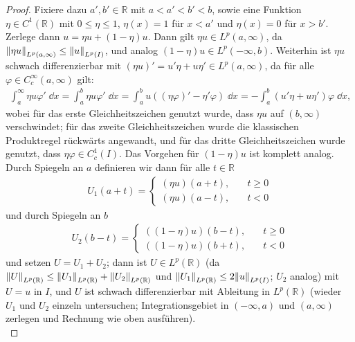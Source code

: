 \documentclass[twoside]{article}
\theoremstyle{definition}
\newcommand{\R}{\mathbb{R}}
\newcommand{\lk}{\left(}
\newcommand{\rk}{\right)}
\begin{document}
\begin{proof}
Fixiere dazu $a',b' \in \R$ mit $a < a' < b' < b$, sowie eine Funktion $\eta \in C^1(\R)$ mit $0 \leq \eta \leq 1$, $\eta(x) = 1$ für $x < a'$ und $\eta(x) = 0$ für $x > b'$. Zerlege dann $u = \eta u + (1-\eta)u$. Dann gilt $\eta u \in L^p(a, \infty)$, da $\norm{\eta u}_{L^p(a,\infty)} \leq \norm{u}_{L^p(I)}$, und analog $(1 - \eta) u \in L^p(-\infty,b)$. Weiterhin ist $\eta u$ schwach differenzierbar mit $(\eta u)' = u' \eta + u \eta' \in L^p(a,\infty)$, da für alle $\varphi \in C^\infty_c(a,\infty)$ gilt:
\begin{align*}
\int_a^\infty \eta u \varphi' \; \dd x = \int_a^b \eta u \varphi' \; \dd x = \int_{a}^b u \lk \lk \eta \varphi \rk' - \eta' \varphi  \rk \; \dd x = - \int_a^b \lk u' \eta + u \eta' \rk \varphi \; \dd x,
\end{align*}
wobei für das erste Gleichheitszeichen genutzt wurde, dass $\eta u$ auf $(b, \infty)$ verschwindet; für das zweite Gleichheitszeichen wurde die klassischen Produktregel rückwärts angewandt, und für das dritte Gleichheitszeichen wurde genutzt, dass $\eta \varphi \in C^1_c(I)$. Das Vorgehen für $(1 - \eta) u$ ist komplett analog. Durch Spiegeln an $a$ definieren wir dann für alle $t \in \R$
\begin{align*}
U_1(a+t) = \begin{cases}
(\eta u)(a+t), \quad & t \geq 0\\
(\eta u)(a - t), \quad & t < 0
\end{cases}
\end{align*}
und durch Spiegeln an $b$
\begin{align*}
U_2(b - t) = \begin{cases}
((1 - \eta) u)(b - t), \quad & t \geq 0\\
((1 - \eta) u)(b + t), \quad & t < 0
\end{cases}
\end{align*}
und setzen $U = U_1 + U_2$; dann ist $U \in L^p(\R)$ (da $\norm{U}_{L^p(\R)} \leq \norm{U_1}_{L^p(\R)} + \norm{U_2}_{L^p(\R)}$ und $\norm{U_1}_{L^p(\R)} \leq 2 \norm{u}_{L^p(I)}$; $U_2$ analog) mit $U = u$ in $I$, und $U$ ist schwach differenzierbar mit Ableitung in $L^p(\R)$ (wieder $U_1$ und $U_2$ einzeln untersuchen; Integrationsgebiet in $(- \infty, a)$ und $(a, \infty)$ zerlegen und Rechnung wie oben ausführen).\\


\end{proof}
\end{document}
